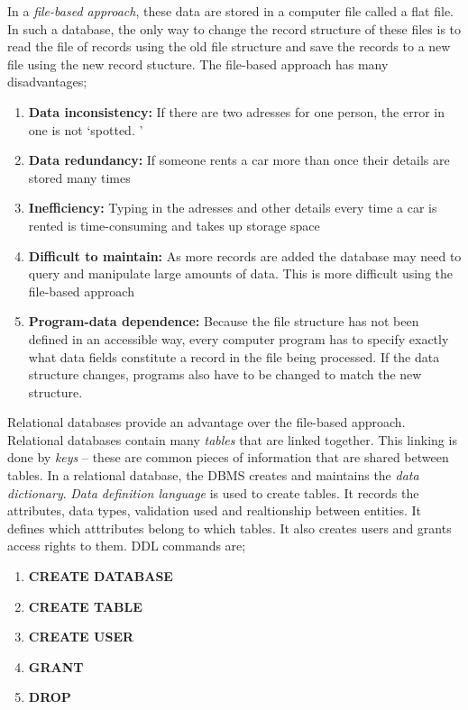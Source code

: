 \documentclass{article}
\begin{document}
In a \textit{file-based approach}, these data are stored in a computer file
called a flat file. In such a database, the only way to change the record
structure of these files is to read the file of records using the old file
structure and save the records to a new file using the new record stucture. The
file-based approach has many disadvantages;\begin{enumerate}
    
    \item \textbf{Data inconsistency:} If there are two adresses for one person,
        the error in one is not `spotted.  '

    \item \textbf{Data redundancy:} If someone rents a car more than once their
        details are stored many times

    \item \textbf{Inefficiency:} Typing in the adresses and other details every
        time a car is rented is time-consuming and takes up storage space

    \item \textbf{Difficult to maintain:} As more records are added the database
        may need to query and manipulate large amounts of data. This is more
        difficult using the file-based approach
        
    \item \textbf{Program-data dependence:} Because the file structure has not
        been defined in an accessible way, every computer program has to specify
        exactly what data fields constitute a record in the file being
        processed. If the data structure changes, programs also have to be
        changed to match the new structure.

\end{enumerate} Relational databases provide an advantage over the file-based
approach. Relational databases contain many \textit{tables} that are linked
together. This linking is done by \textit{keys} -- these are common pieces of
information that are shared between tables. In a relational database, the DBMS
creates and maintains the \textit{data dictionary}. \textit{Data definition
language} is used to create tables. It records the attributes, data types, validation used and realtionship between entities. It defines which atttributes
belong to which tables. It also creates users and grants access rights to them.
DDL commands are;\begin{enumerate}

    \item \textbf{CREATE DATABASE}
    
    \item \textbf{CREATE TABLE}
    
    \item \textbf{CREATE USER}
    
    \item \textbf{GRANT}
    
    \item \textbf{DROP}

\end{enumerate}
\end{document}
